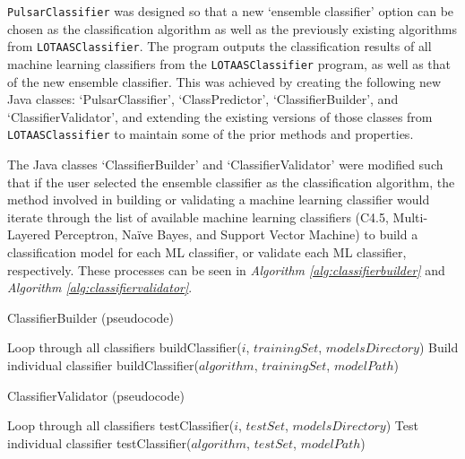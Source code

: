 \documentclass{article}
\begin{document}
\verb|PulsarClassifier| was designed so that a new `ensemble classifier' option can be chosen as the classification algorithm as well as the previously existing algorithms from \verb|LOTAASClassifier|. The program outputs the classification results of all machine learning classifiers from the \verb|LOTAASClassifier| program, as well as that of the new ensemble classifier. This was achieved by creating the following new Java classes: `PulsarClassifier', `ClassPredictor', `ClassifierBuilder', and `ClassifierValidator', and extending the existing versions of those classes from \verb|LOTAASClassifier| to maintain some of the prior methods and properties.

The Java classes `ClassifierBuilder' and `ClassifierValidator' were modified such that if the user selected the ensemble classifier as the classification algorithm, the method involved in building or validating a machine learning classifier would iterate through the list of available machine learning classifiers (C4.5, Multi-Layered Perceptron, Naïve Bayes, and Support Vector Machine) to build a classification model for each ML classifier, or validate each ML classifier, respectively. These processes can be seen in \emph{Algorithm \ref{alg:classifierbuilder}} and \emph{Algorithm \ref{alg:classifiervalidator}}.

\begin{algorithm}[H]
    \caption{ClassifierBuilder (pseudocode)}
    \label{alg:classifierbuilder}
    \begin{algorithmic}[1]
                \Comment Loop through all classifiers
                \State buildClassifier($i$, $trainingSet$, $modelsDirectory$)
            \EndFor
        \Else 
            \Comment Build individual classifier
            \State buildClassifier($algorithm$, $trainingSet$, $modelPath$)
            
        \EndIf
    \end{algorithmic}
\end{algorithm}

\begin{algorithm}[H]
    \caption{ClassifierValidator (pseudocode)}
    \label{alg:classifiervalidator}
    \begin{algorithmic}[1]
                \Comment Loop through all classifiers
                \State testClassifier($i$, $testSet$, $modelsDirectory$)
            \EndFor
        \Else 
            \Comment Test individual classifier
            \State testClassifier($algorithm$, $testSet$, $modelPath$)
        \EndIf
        
    \end{algorithmic}
\end{algorithm}
\end{document}

